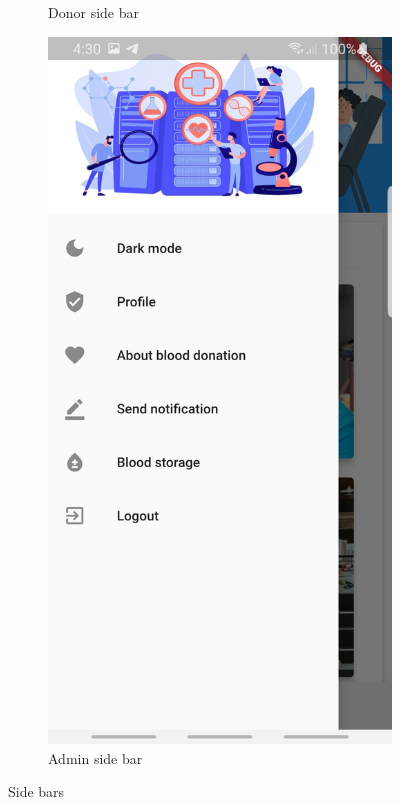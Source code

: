 \begin{figure}[H]
\begin{subfigure}[b]{0.409\linewidth}
    \caption{Donor side bar}
    \end{subfigure}
    \begin{subfigure}[b]{0.4\linewidth}
        \includegraphics[width=\linewidth]{images1/sidebaradmin.jpg}
    \caption{Admin side bar}
    \end{subfigure}
\caption{Side bars}
\label{fig:distribution}
\end{figure}




